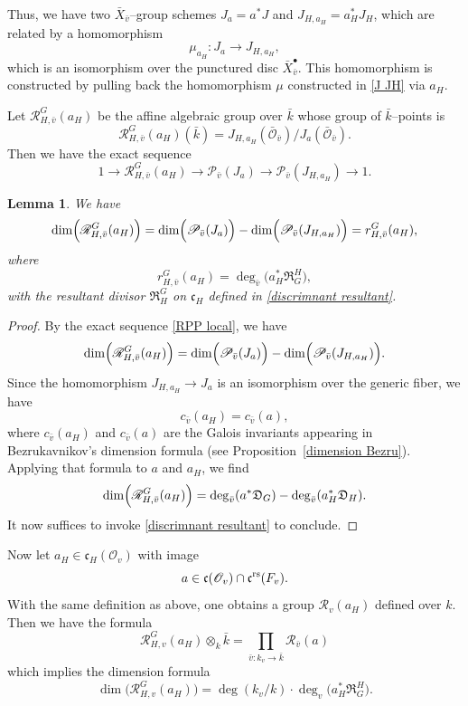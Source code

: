 \documentclass[12pt,english]{smfart}
\numberwithin{equation}{subsection}
\newtheorem{lemma}[equation]{Lemma}
\theoremstyle{remark}
\newcommand\calP{{\mathscr P}}
\newcommand\calR{{\mathscr R}}
\newcommand\calO{{\mathscr O}}
\newcommand\frakc{{\mathfrak c}}
\newcommand\rs{{\rm rs}}
\newcommand\resultant{\mathfrak R}
\newcommand\discrim{\mathfrak D}
\begin{document}
Thus, we have two $\bar X_{\bar v}$--group schemes $J_a=a^*J$ and $J_{H,a_H}=a_H^*J_H$, which are related by a homomorphism
$$
\mu_{a_H}: J_a \to J_{H,a_H},
$$
which is an isomorphism over the punctured disc $\bar X_{\bar v}^\bullet$. This homomorphism is constructed by pulling back the homomorphism $\mu$ constructed in \ref{J JH} via $a_H$.

Let $\calR_{H,\bar v}^G(a_H)$ be the affine algebraic group over $\bar{k}$ whose group of $\bar{k}$--points is
$$
\calR_{H,\bar v}^G(a_H)(\bar{k})=J_{H,a_H}(\bar{\calO}_{\bar v})/ J_a(\bar{\calO}_{\bar v}).
$$
Then we have the exact sequence
\begin{equation}\label{RPP local}
1\rightarrow \calR_{H,\bar v}^G(a_H)\rightarrow \calP_{\bar v}(J_a) \rightarrow \calP_{\bar v}(J_{H,a_H})\rightarrow 1.
\end{equation}

\begin{lemma}
We have
$$
\dim\Bigl(\calR_{H,\bar v}^G(a_H)\Bigr)=\dim\Bigl(\calP_{\bar v}(J_a)\Bigr)-\dim\Bigl(\calP_{\bar v}(J_{H,a_H})\Bigr)=r_{H,\bar v}^G(a_H),
$$
where 
$$
r_{H,\bar v}^G(a_H)=\deg_{\bar v}\bigl(a_H^*\resultant_G^H\bigr),
$$
with the resultant divisor $\resultant_H^G$ on $\frakc_H$ defined in \ref{discrimnant resultant}.
\end{lemma}

\begin{proof}
By the exact sequence \eqref{RPP local}, we have
$$
\dim\Bigl(\calR_{H,\bar v}^G(a_H)\Bigr)=\dim\Bigl(\calP_{\bar v}(J_a)\Bigr)-\dim\Bigl(\calP_{\bar v}(J_{H,a_H})\Bigr).
$$
Since the homomorphism $J_{H,a_H}\rightarrow J_a$ is an isomorphism over the generic fiber, we have
$$
c_{\bar v}(a_H)=c_{\bar v}(a),
$$
where $c_{\bar v}(a_H)$ and $c_{\bar v}(a)$ are the Galois invariants appearing in Bezrukavnikov's dimension formula (see Proposition~\ref{dimension Bezru}). Applying that formula to $a$ and $a_H$, we find
$$
\dim\Bigl(\calR_{H,\bar v}^G(a_H)\Bigr)=\deg_{\bar v}(a^*\discrim_G)-\deg_{\bar v}(a_H^*\discrim_H).
$$
It now suffices to invoke \ref{discrimnant resultant} to conclude.
\end{proof}

Now let $a_H\in\frakc_H(\calO_v)$ with image
$$
a\in\frakc(\calO_v)\cap \frakc^\rs(F_v).
$$
With the same definition as above, one obtains a group $\calR_v(a_H)$ defined over $k$. Then we have the formula
$$
\calR_{H,v}^G(a_H)\otimes_k \bar{k} = \prod_{\bar{v}: k_v \rightarrow \bar{k}} \calR_{\bar{v}}(a)
$$
which implies the dimension formula
$$
\dim\bigl(\calR_{H,v}^G(a_H)\bigr)=\deg(k_v/k)\cdot\deg_v\bigl(a_H^* \resultant^H_G\bigr).
$$
\end{document}
